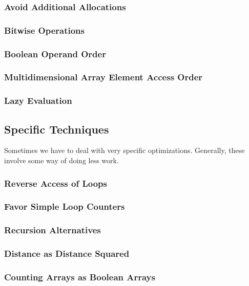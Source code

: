 \subsubsection{Avoid Additional Allocations}

\subsubsection{Bitwise Operations}

\subsubsection{Boolean Operand Order}

\subsubsection{Multidimensional Array Element Access Order}

\subsubsection{Lazy Evaluation}

\subsection{Specific Techniques}

Sometimes we have to deal with very specific optimizations. Generally, these involve some way of doing less work.

\subsubsection{Reverse Access of Loops}

\subsubsection{Favor Simple Loop Counters}

\subsubsection{Recursion Alternatives}

\subsubsection{Distance as Distance Squared}

\subsubsection{Counting Arrays as Boolean Arrays}


